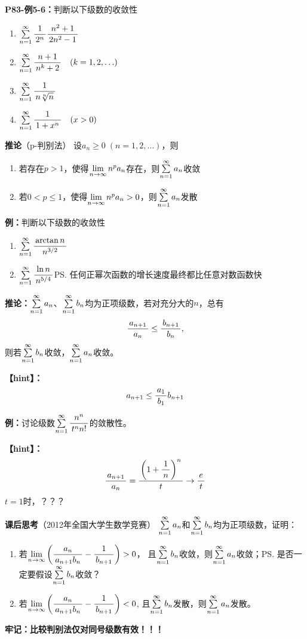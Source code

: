 {\bf P83-例5-6：}判断以下级数的收敛性
\begin{enumerate}[(1)]
  \setlength{\itemindent}{1cm}
  \item $\sumn\df 1{2^n}\df{n^2+1}{2n^2-1}$ 
  \item $\sumn\df{n+1}{n^k+2}\quad (k=1,2,\ldots)$ 
  \item $\sumn\df{1}{n\sqrt[n]{n}}$ 
  \item $\sumn\df{1}{1+x^n}\quad(x>0)$
\end{enumerate}

{\bf 推论}（p-判别法）
设$a_n\geq 0\;(n=1,2,\ldots)$，则 
\begin{enumerate}
  \setlength{\itemindent}{1cm}
  \item 若存在$p>1$，使得$\limn n^pa_n$存在，则$\sumn a_n$收敛 
  \item 若$0<p\leq 1$，使得$\limn n^pa_n>0$，则$\sumn a_n$发散
\end{enumerate}

{\bf 例：}判断以下级数的收敛性
\begin{enumerate}[(1)]
  \setlength{\itemindent}{1cm}
  \item $\sumn\df{\arctan n}{n^{3/2}}$
  \item $\sumn\df{\ln n}{n^{5/4}}$\ps{任何正幂次函数的增长速度最终都比任意对数函数快}
\end{enumerate}

{\bf 推论：}$\sumn a_n$、$\sumn b_n$均为正项级数，若对充分大的$n$，总有
$$\df{a_{n+1}}{a_n}\leq\df{b_{n+1}}{b_n},$$
则若$\sumn b_n$收敛，$\sumn a_n$收敛。

{\bf 【hint】：}
$$a_{n+1}\leq\df{a_1}{b_1}b_{n+1}$$

{\bf 例：}讨论级数$\sumn\df{n^n}{t^nn!}$的敛散性。

{\bf 【hint】：}
$$\df{a_{n+1}}{a_n}=\df{\left(1+\df1n\right)^n}{t}\to\df et$$
$t=1$时，？？？

{\bf 课后思考}（2012年全国大学生数学竞赛）
$\sumn a_n$和$\sumn b_n$均为正项级数，证明：
\begin{enumerate}
  \setlength{\itemindent}{1cm}
  \item 若$\limn\left(\df{a_n}{a_{n+1}b_n}-\df 1{b_{n+1}}\right)>0$，
  且$\sumn b_n$收敛，则$\sumn a_n$收敛；\ps{是否一定要假设$\sumn b_n$收敛？}
  \item 若$\limn\left(\df{a_n}{a_{n+1}b_n}-\df 1{b_{n+1}}\right)<0$,
  且$\sumn b_n$发散，则$\sumn a_n$发散。
\end{enumerate}

{\bf 牢记：比较判别法仅对同号级数有效！！！}

